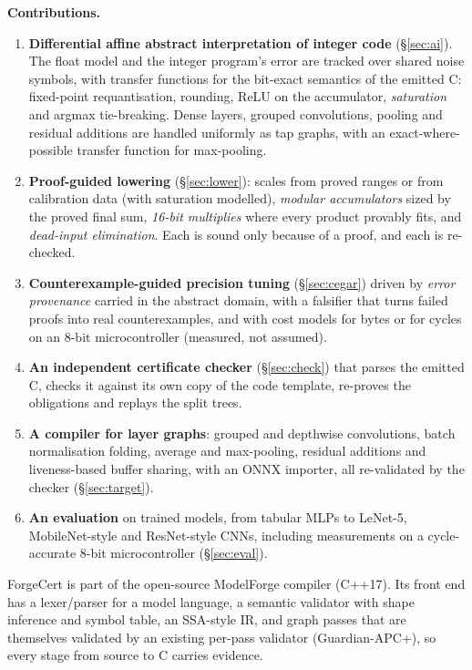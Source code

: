 \documentclass[conference]{IEEEtran}
\begin{document}
\textbf{Contributions.}
\begin{enumerate}
\item \textbf{Differential affine abstract interpretation of integer code} (\S\ref{sec:ai}). The float model and the integer program's error are tracked over shared noise symbols, with transfer functions for the bit-exact semantics of the emitted C: fixed-point requantisation, rounding, ReLU on the accumulator, \emph{saturation} and argmax tie-breaking. Dense layers, grouped convolutions, pooling and residual additions are handled uniformly as tap graphs, with an exact-where-possible transfer function for max-pooling.
\item \textbf{Proof-guided lowering} (\S\ref{sec:lower}): scales from proved ranges or from calibration data (with saturation modelled), \emph{modular accumulators} sized by the proved final sum, \emph{16-bit multiplies} where every product provably fits, and \emph{dead-input elimination}. Each is sound only because of a proof, and each is re-checked.
\item \textbf{Counterexample-guided precision tuning} (\S\ref{sec:cegar}) driven by \emph{error provenance} carried in the abstract domain, with a falsifier that turns failed proofs into real counterexamples, and with cost models for bytes or for cycles on an 8-bit microcontroller (measured, not assumed).
\item \textbf{An independent certificate checker} (\S\ref{sec:check}) that parses the emitted C, checks it against its own copy of the code template, re-proves the obligations and replays the split trees.
\item \textbf{A compiler for layer graphs}: grouped and depthwise convolutions, batch normalisation folding, average and max-pooling, residual additions and liveness-based buffer sharing, with an ONNX importer, all re-validated by the checker (\S\ref{sec:target}).
\item \textbf{An evaluation} on \FCModels{} trained models, from tabular MLPs to LeNet-5, MobileNet-style and ResNet-style CNNs, including measurements on a cycle-accurate 8-bit microcontroller (\S\ref{sec:eval}).
\end{enumerate}
ForgeCert is part of the open-source ModelForge compiler (C++17). Its front end has a lexer/parser for a model language, a semantic validator with shape inference and symbol table, an SSA-style IR, and graph passes that are themselves validated by an existing per-pass validator (Guardian-APC+), so every stage from source to C carries evidence.
\end{document}
